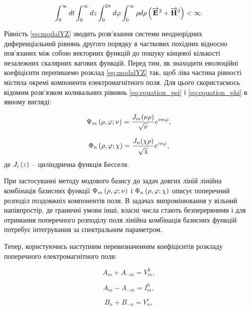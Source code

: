 \begin{equation} \label{eq:energy_restrict}
\int_0^\infty dt \int_0^\infty dz 
\int_0^{2\pi} d\varphi \int_0^\infty \rho d \rho
\left(  \overrightarrow{\mathbf E}^2 + \overrightarrow{\mathbf H}^2 \right) < \infty.
\end{equation}

Рівність \eqref{eq:modalYZ} зводить розв'язання системи неоднорідних 
диференціальний рівнянь другого порядку в часткових похідних  
відносно пов'язаних між собою векторних функцій до пошуку кінцевої кількості 
незалежних скалярних вагових функцій. Перед тим, як знаходити еволюційні 
коефіцієнти перепишемо розклад \eqref{eq:modalYZ} так, щоб ліва 
частина рівності містила окремі компоненти електромагнітного поля. Для цього 
скористаємось відомим розв'язком коливальних рівнянь \eqref{eq:equation_psi} 
і \eqref{eq:equation_phi} в явному вигляді:

\begin{equation}
\Psi_m \left( \rho, \varphi; \nu \right) = 
\frac{J_m (\nu \rho)}{\sqrt{\nu}} e^{im\varphi},
\end{equation}

\begin{equation}
\Phi_n \left( \rho, \varphi; \chi \right) = 
\frac{J_n (\chi \rho)}{\sqrt{\chi}} e^{in\varphi},
\end{equation}
%
де $ J_i \left( z \right) $ -- циліндрична функція Бесселя. 

При застосуванні методу модового базису до задач довгих ліній  лінійна 
комбінація базисних функції $ \Psi_m \left( \rho, \varphi; \nu \right) $ і
$ \Phi_n \left( \rho, \varphi; \chi \right) $ описує поперечний розподіл 
поздовжніх компонентів поля. В задачах випромінювання у вільний 
напівпростір, де граничні умови інші, власні числа стають 
безперервними і для отримання поперечного розподілу поля лінійна 
комбінація базисних функцій потребує інтегрування за спектральним 
параметром.

Тепер, користуючись наступним перевизначенням коефіцієнтів розкладу 
поперечного електромагнітного поля:

\begin{equation}
A_m + A_{-m} = V_m^h,
\end{equation}

\begin{equation}
A_m - A_{-m} = I_m^h,
\end{equation}

\begin{equation}
B_n + B_{-n} = V_n^e,
\end{equation}

